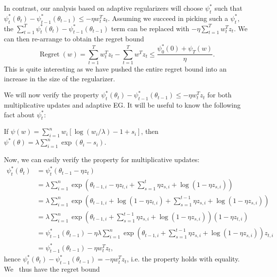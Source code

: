 \documentclass[11pt]{article}
\DeclareMathOperator{\Regret}{Regret}
\begin{document}
In contrast, our analysis based on adaptive regularizers will choose $\psi_t^*$ such that $\psi_t^*(\theta_t) - \psi_{t-1}^*(\theta_{t-1}) \leq -\eta w_t^Tz_t$. 
Assuming we succeed in picking such a $\psi_t^*$, the $\sum_{t=1}^T \psi_t^*(\theta_t) - \psi_{t-1}^*(\theta_{t-1})$ term can be replaced with 
$-\eta \sum_{t=1}^T w_t^Tz_t$. We can then re-arrange to obtain the regret bound
\begin{equation}
        \label{eqn:bound3}
        \Regret(w) = \sum_{t=1}^T w_t^Tz_t - \sum_{t=1}^T w^Tz_t \leq \frac{\psi_0^*(0) + \psi_T(w)}{\eta}.
\end{equation}
This is quite interesting as we have pushed the entire regret bound into an increase in the size 
of the regularizer.

We will now verify the property $\psi_t^*(\theta_t) - \psi_{t-1}^*(\theta_{t-1}) \leq -\eta w_t^Tz_t$ 
for both multiplicative updates and adaptive EG. It will be useful to know the following fact about 
$\psi_t^*$:
\begin{lemma}
        \label{lem:fenchel}
        If $\psi(w) = \sum_{i=1}^n w_i[\log(w_i/\lambda)-1+s_i]$, 
        then $\psi^*(\theta) = \lambda \sum_{i=1}^n \exp(\theta_i - s_i)$.
\end{lemma}
Now, we can easily verify the property for multiplicative updates:
\begin{align}
        \psi_t^*(\theta_t) &= \psi_t^*(\theta_{t-1}- \eta z_t) \\
                           &= \lambda \sum_{i=1}^n \exp\left(\theta_{t-1,i} - \eta z_{t,i} + \sum_{s=1}^t \eta z_{s,i} + \log(1 - \eta z_{s,i})\right) \\
                           &= \lambda \sum_{i=1}^n \exp\left(\theta_{t-1,i} + \log(1- \eta z_{t,i}) + \sum_{s=1}^{t-1} \eta z_{s,i} + \log(1 - \eta z_{s,i})\right) \\
                           &= \lambda \sum_{i=1}^n \exp\left(\theta_{t-1,i} + \sum_{s=1}^{t-1} \eta z_{s,i} + \log(1 - \eta z_{s,i})\right)(1 - \eta z_{t,i}) \\
                           &= \psi_{t-1}^*(\theta_{t-1}) - \eta \lambda \sum_{i=1}^n \exp\left(\theta_{t-1,i} + \sum_{s=1}^{t-1} \eta z_{s,i} + \log(1- \eta z_{s,i})\right) z_{t,i} \\
                           &= \psi_{t-1}^*(\theta_{t-1}) - \eta w_t^Tz_t,
\end{align}
hence $\psi_t^*(\theta_t) - \psi_{t-1}^*(\theta_{t-1}) = -\eta w_t^Tz_t$, i.e. the property holds with equality. We \
thus have the regret bound
\end{document}
